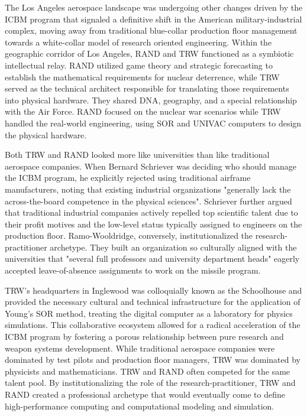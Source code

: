 The Los Angeles aerospace landscape was undergoing other changes driven by the ICBM program that signaled a definitive shift in the American military-industrial complex, moving away from traditional blue-collar production floor management towards a white-collar model of research oriented engineering. Within the geographic corridor of Los Angeles, RAND and TRW functioned as a symbiotic intellectual relay. RAND utilized game theory and strategic forecasting to establish the mathematical requirements for nuclear deterrence, while TRW served as the technical architect responsible for translating those requirements into physical hardware. They shared DNA, geography, and a special relationship with the Air Force. RAND focused on the nuclear war scenarios while TRW handled the real-world engineering, using SOR and UNIVAC computers to design the physical hardware.

Both TRW and RAND looked more like universities than like traditional aerospace companies. When Bernard Schriever was deciding who should manage the ICBM program, he explicitly rejected using traditional airframe manufacturers, noting that existing industrial organizations "generally lack the across-the-board competence in the physical sciences". Schriever further argued that traditional industrial companies actively repelled top scientific talent due to their profit motives and the low-level status typically assigned to engineers on the production floor. Ramo-Wooldridge, conversely, institutionalized the research-practitioner archetype. They built an organization so culturally aligned with the universities that "several full professors and university department heads" eagerly accepted leave-of-absence assignments to work on the missile program. 

TRW’s headquarters in Inglewood was colloquially known as the Schoolhouse and provided the necessary cultural and technical infrastructure for the application of Young’s SOR method, treating the digital computer as a laboratory for physics simulations. This collaborative ecosystem allowed for a radical acceleration of the ICBM program by fostering a porous relationship between pure research and weapon systems development. While traditional aerospace companies were dominated by test pilots and production floor managers, TRW was dominated by physicists and mathematicians. TRW and RAND often competed for the same talent pool. By institutionalizing the role of the research-practitioner, TRW and RAND created a professional archetype that would eventually come to define high-performance computing and computational modeling and simulation. 

